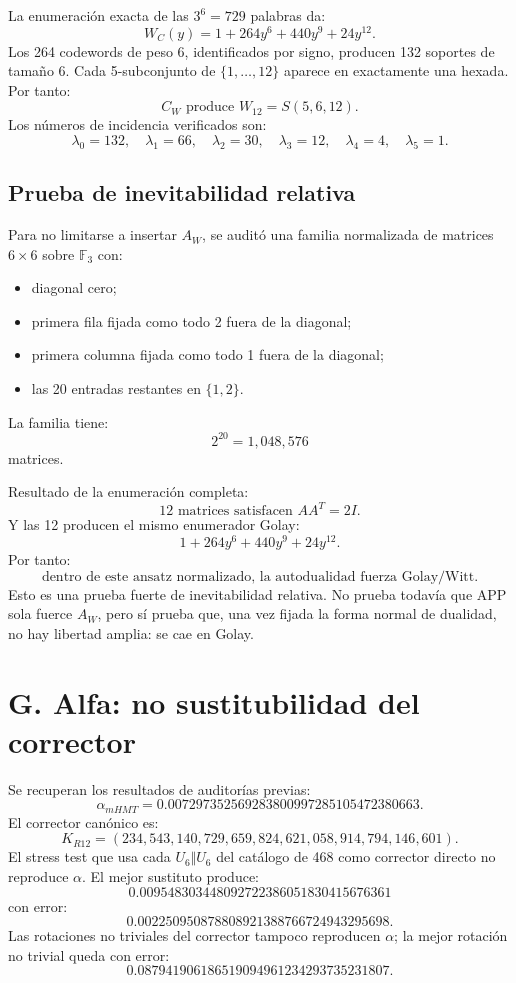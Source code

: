 \documentclass[11pt,a4paper]{article}
\theoremstyle{definition}\newtheorem{definicion}[teorema]{Definici\'on}
\theoremstyle{remark}\newtheorem{observacion}[teorema]{Observaci\'on}
\newcommand{\F}{\mathbb F}
\begin{document}
La enumeraci\'on exacta de las \(3^6=729\) palabras da:
\[
\boxed{W_C(y)=1+264y^6+440y^9+24y^{12}.}
\]
Los 264 codewords de peso 6, identificados por signo, producen 132 soportes de tama\~no 6. Cada 5-subconjunto de \(\{1,
\ldots,12\}\) aparece en exactamente una hexada. Por tanto:
\[
\boxed{C_W\text{ produce }W_{12}=S(5,6,12).}
\]
Los n\'umeros de incidencia verificados son:
\[
\lambda_0=132,
\quad
\lambda_1=66,
\quad
\lambda_2=30,
\quad
\lambda_3=12,
\quad
\lambda_4=4,
\quad
\lambda_5=1.
\]

\subsection*{Prueba de inevitabilidad relativa}

Para no limitarse a insertar \(A_W\), se audit\'o una familia normalizada de matrices \(6\times6\) sobre \(\F_3\) con:
\begin{itemize}[leftmargin=2em]
\item diagonal cero;
\item primera fila fijada como todo 2 fuera de la diagonal;
\item primera columna fijada como todo 1 fuera de la diagonal;
\item las 20 entradas restantes en \(\{1,2\}\).
\end{itemize}
La familia tiene:
\[
2^{20}=1,048,576
\]
matrices.

Resultado de la enumeraci\'on completa:
\[
\boxed{12\text{ matrices satisfacen }AA^T=2I.}
\]
Y las 12 producen el mismo enumerador Golay:
\[
\boxed{1+264y^6+440y^9+24y^{12}.}
\]
Por tanto:
\[
\boxed{\text{dentro de este ansatz normalizado, la autodualidad fuerza Golay/Witt.}}
\]
Esto es una prueba fuerte de inevitabilidad relativa. No prueba todav\'ia que APP sola fuerce \(A_W\), pero s\'i prueba que, una vez fijada la forma normal de dualidad, no hay libertad amplia: se cae en Golay.

\section{G. Alfa: no sustitubilidad del corrector}

Se recuperan los resultados de auditor\'ias previas:
\[
\alpha_{
m HMT}=0.007297352569283800997285105472380663.
\]
El corrector can\'onico es:
\[
K_{R12}=(234,543,140,729,659,824,621,058,914,794,146,601).
\]
El stress test que usa cada \(U_6\Vert U_6\) del cat\'alogo de 468 como corrector directo no reproduce \(\alpha\). El mejor sustituto produce:
\[
0.009548303448092722386051830415676361
\]
con error:
\[
0.002250950878808921388766724943295698.
\]
Las rotaciones no triviales del corrector tampoco reproducen \(\alpha\); la mejor rotaci\'on no trivial queda con error:
\[
0.087941906186519094961234293735231807.
\]
\end{document}
